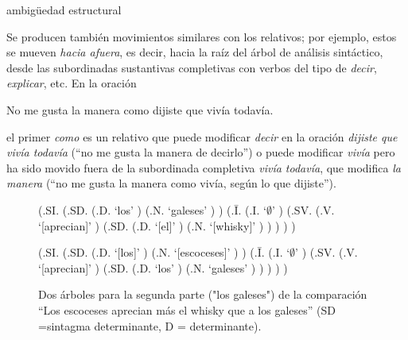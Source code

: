 \begin{persabermes}{ambigüedad estructural}
\begin{enumerate}
Se producen también movimientos similares con los relativos; por ejemplo, estos se mueven \emph{hacia afuera}, es decir, hacia la raíz del árbol de análisis sintáctico, desde las subordinadas sustantivas completivas con verbos del tipo de {\em decir}, \emph{explicar}, etc. En la oración \begin{example} No me gusta la manera como dijiste que vivía todavía. \end{example} el primer \emph{como} es un relativo que puede modificar \emph{decir} en la oración \emph{dijiste que vivía todavía} (``no me gusta la manera de decirlo'') o puede modificar {\em vivía} pero ha sido movido fuera de la subordinada completiva \emph{vivía todavía}, que modifica {\em la manera} (``no me gusta la manera como vivía, según lo que dijiste''). \end{enumerate} \end{persabermes} 

\begin{figure} \begin{center} \begin{parsetree} (.SI. (.SD. (.D. `los' ) (.N. `galeses' ) ) (.{\={I}}. (.I. `$\emptyset$' ) (.SV. (.V. `[aprecian]' ) (.SD. (.D. `[el]' ) (.N. `[whisky]' ) ) ) ) ) \end{parsetree} \end{center} \begin{center} \begin{parsetree} (.SI. (.SD. (.D. `[los]' ) (.N. `[escoceses]' ) ) (.{\={I}}. (.I. `$\emptyset$' ) (.SV. (.V. `[aprecian]' ) (.SD. (.D. `los' ) (.N. `galeses' ) ) ) ) ) \end{parsetree} \end{center} \caption{Dos árboles para la segunda parte ("los galeses") de la comparación ``Los escoceses aprecian más el whisky que a los galeses'' (SD =sintagma determinante, D = determinante).} \label{fg:whisky} \end{figure} 

